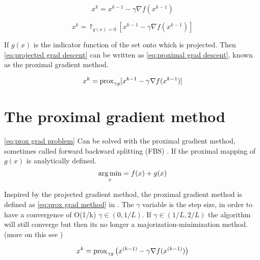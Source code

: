 		\begin{equation}
			x^k = x^{k-1} - \gamma \nabla f(x^{k-1})
			\label{eq:grad descent}
		\end{equation}
		
		\begin{equation}
			x^k = \project_{g(x)=0}[ x^{k-1} - \gamma \nabla f(x^{k-1})]
			\label{eq:projected grad descent}
		\end{equation}
		
		If $g(x)$ is the indicator function of the set onto which is projected. Then  \eqref{eq:projected grad descent} can be written as \eqref{eq:proximal grad descent}, known as the proximal gradient method.
		
		\begin{equation}
				x^k = \operatorname{prox}_{\gamma g}[ x^{k-1} - \gamma \nabla f(x^{k-1})]
			\label{eq:proximal grad descent}
		\end{equation}
	
	\section{The proximal gradient method}
		\eqref{eq:prox grad problem} Can be solved with the proximal gradient method, sometimes called forward backward splitting (FBS) . If the proximal mapping of $g(x)$ is analytically defined. 
			\begin{equation}
			\underset{x}{\operatorname*{arg\,min}} = f(x) + g(x)
			\label{eq:prox grad problem}
			\end{equation}
		
		Inspired by the projected gradient method, the proximal gradient method is defined as \eqref{eq:prox grad method} in \cite{NealParikh}. The $\gamma$ variable is the step size, in order to have a convergence of O(1/k) $\gamma \in(0,1/L)$. If $\gamma \in (1/L,2/L)$ the algorithm will still converge but then its no longer a majorization-minimization method. (more on this see \cite{NealParikh})
		
		\begin{equation}
			x^k = \operatorname{prox}_{\gamma g}\big( x^{(k-1)}- \gamma \nabla f(x^{(k-1)})\big)
			\label{eq:prox grad method}
		\end{equation}	
	
